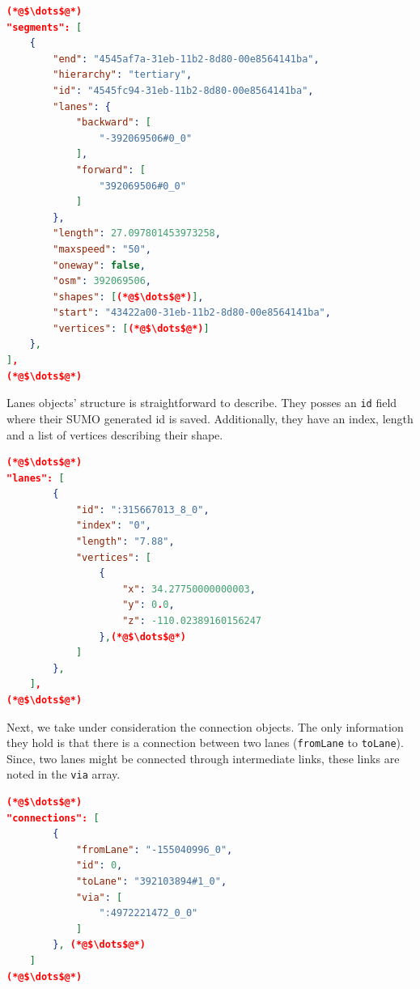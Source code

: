 \begin{scriptsize}
        \begin{lstlisting}[language=json,firstnumber=1,caption={General overview of the segments key in the JSON export format.},label={lis:format-lanes}]
(*@$\dots$@*)
"segments": [
    {
        "end": "4545af7a-31eb-11b2-8d80-00e8564141ba",
        "hierarchy": "tertiary",
        "id": "4545fc94-31eb-11b2-8d80-00e8564141ba",
        "lanes": {
            "backward": [
                "-392069506#0_0"
            ],
            "forward": [
                "392069506#0_0"
            ]
        },
        "length": 27.097801453973258,
        "maxspeed": "50",
        "oneway": false,
        "osm": 392069506,
        "shapes": [(*@$\dots$@*)],
        "start": "43422a00-31eb-11b2-8d80-00e8564141ba",
        "vertices": [(*@$\dots$@*)]
    },
],           
(*@$\dots$@*)
	   \end{lstlisting}
    \end{scriptsize}

Lanes objects' structure is straightforward to describe. They posses an \texttt{id} field where their SUMO generated id is saved. Additionally, they have an index, length and a list of vertices describing their shape.\\
 
\begin{scriptsize}
        \begin{lstlisting}[language=json,firstnumber=1,caption={General overview of the lanes key in the JSON export format.},label={lis:format-node}]
(*@$\dots$@*)
"lanes": [
        {
            "id": ":315667013_8_0",
            "index": "0",
            "length": "7.88",
            "vertices": [
                {
                    "x": 34.27750000000003,
                    "y": 0.0,
                    "z": -110.02389160156247
                },(*@$\dots$@*)
            ]
        },
    ],
(*@$\dots$@*)
	   \end{lstlisting}
    \end{scriptsize}
    
Next, we take under consideration the connection objects. The only information they hold is that there is a connection between two lanes (\texttt{fromLane} to \texttt{toLane}). Since, two lanes might be connected through intermediate links, these links are noted in the \texttt{via} array.\\
    
    \begin{scriptsize}
        \begin{lstlisting}[language=json,firstnumber=1,caption={General overview of the connection key in the JSON export format.},label={lis:format-node}]
(*@$\dots$@*)
"connections": [
        {
            "fromLane": "-155040996_0",
            "id": 0,
            "toLane": "392103894#1_0",
            "via": [
                ":4972221472_0_0"
            ]
        }, (*@$\dots$@*)
    ]
(*@$\dots$@*)
	   \end{lstlisting}
    \end{scriptsize}
    
